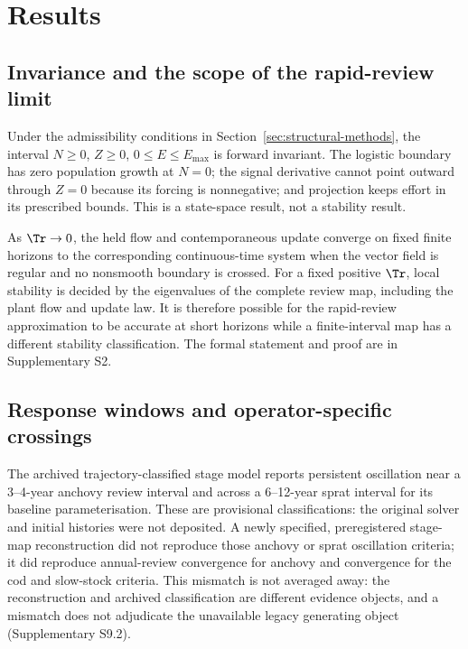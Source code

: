 \section{Results}\label{sec:results}

\subsection{Invariance and the scope of the rapid-review limit}\label{sec:invariance-results}

Under the admissibility conditions in Section~\ref{sec:structural-methods}, the interval \(N\geq0\), \(Z\geq0\), \(0\leq E\leq E_{\max}\) is forward invariant. The logistic boundary has zero population growth at \(N=0\); the signal derivative cannot point outward through \(Z=0\) because its forcing is nonnegative; and projection keeps effort in its prescribed bounds. This is a state-space result, not a stability result.

As \(\Tr\to0\), the held flow and contemporaneous update converge on fixed finite horizons to the corresponding continuous-time system when the vector field is regular and no nonsmooth boundary is crossed. For a fixed positive \(\Tr\), local stability is decided by the eigenvalues of the complete review map, including the plant flow and update law. It is therefore possible for the rapid-review approximation to be accurate at short horizons while a finite-interval map has a different stability classification. The formal statement and proof are in Supplementary S2.

\subsection{Response windows and operator-specific crossings}\label{sec:crossings}

The archived trajectory-classified stage model reports persistent oscillation near a 3--4-year anchovy review interval and across a 6--12-year sprat interval for its baseline parameterisation. These are provisional classifications: the original solver and initial histories were not deposited. A newly specified, preregistered stage-map reconstruction did not reproduce those anchovy or sprat oscillation criteria; it did reproduce annual-review convergence for anchovy and convergence for the cod and slow-stock criteria. This mismatch is not averaged away: the reconstruction and archived classification are different evidence objects, and a mismatch does not adjudicate the unavailable legacy generating object (Supplementary S9.2).

